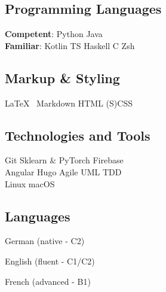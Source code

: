 \documentclass[]{jonas-cv}
\begin{document}
\lastupdated


%
%

\begin{minipage}[t]{0.33\textwidth} 


\tinysectionsep
\vspace{0.3mm}

\subsection{Programming Languages}
\textbf{Competent}: Python \smalltextbullet{} Java\\
\textbf{Familiar}: Kotlin \smalltextbullet{} TS \smalltextbullet{} Haskell \smalltextbullet{} C \smalltextbullet{} Zsh
\sectionsep

\subsection{Markup \& Styling}
\LaTeX \ \smalltextbullet{} Markdown \smalltextbullet{} HTML \smalltextbullet{} (S)CSS
\sectionsep

\subsection{Technologies and Tools}
Git \smalltextbullet{} Sklearn \& PyTorch \smalltextbullet{} Firebase \smalltextbullet{}\\
Angular \smalltextbullet{} Hugo \smalltextbullet{} Agile \smalltextbullet{} UML \smalltextbullet{} TDD \smalltextbullet{}\\
Linux \smalltextbullet{} macOS
\sectionsep

\subsection{Languages}
\tinysectionsep
\tinysectionsep

\begin{tightemize}
    \item[\color{headings}\angleRightSymbol] German (native - C2)
    \item[\color{headings}\angleRightSymbol] English (fluent - C1/C2)
    \item[\color{headings}\angleRightSymbol] French (advanced - B1)
\end{tightemize}
\sectionsep 


\end{minipage}
\end{document}
